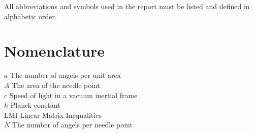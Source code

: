  All abbreviations and symbols used in the report must be listed and defined in alphabetic order.

\section*{Nomenclature}
$a$ \qquad The number of angels per unit area\\
$A$ \qquad The area of the needle point\\
$c$ \qquad Speed of light in a vacuum inertial frame\\
$h$ \qquad Planck constant\\
LMI	\qquad Linear Matrix Inequalities\\
$N$ \qquad The number of angels per needle point
